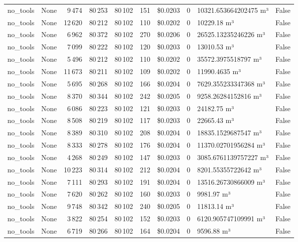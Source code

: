 \documentclass[a4paper,11pt]{article}
\begin{document}
\begin{table}[H]
{\begin{tabular}{l r r r r r r r l r}
no\_tools & None & 9\,474 & 80\,253 & 80\,102 & 151 & \$0.0203 & 0 & 10321.653664202475 m³ & False \\
no\_tools & None & 12\,620 & 80\,212 & 80\,102 & 110 & \$0.0202 & 0 & 10229.18 m³ & False \\
no\_tools & None & 6\,962 & 80\,372 & 80\,102 & 270 & \$0.0206 & 0 & 26525.13235246226 m³ & False \\
no\_tools & None & 7\,099 & 80\,222 & 80\,102 & 120 & \$0.0203 & 0 & 13010.53 m³ & False \\
no\_tools & None & 5\,496 & 80\,212 & 80\,102 & 110 & \$0.0202 & 0 & 35572.3975518797 m³ & False \\
no\_tools & None & 11\,673 & 80\,211 & 80\,102 & 109 & \$0.0202 & 0 & 11990.4635 m³ & False \\
no\_tools & None & 5\,695 & 80\,268 & 80\,102 & 166 & \$0.0204 & 0 & 7629.355233347368 m³ & False \\
no\_tools & None & 8\,370 & 80\,344 & 80\,102 & 242 & \$0.0205 & 0 & 9258.26284152816 m³ & False \\
no\_tools & None & 6\,086 & 80\,223 & 80\,102 & 121 & \$0.0203 & 0 & 24182.75 m³ & False \\
no\_tools & None & 8\,508 & 80\,219 & 80\,102 & 117 & \$0.0203 & 0 & 22665.43 m³ & False \\
no\_tools & None & 8\,389 & 80\,310 & 80\,102 & 208 & \$0.0204 & 0 & 18835.1529687547 m³ & False \\
no\_tools & None & 8\,333 & 80\,278 & 80\,102 & 176 & \$0.0204 & 0 & 11370.02701956284 m³ & False \\
no\_tools & None & 4\,268 & 80\,249 & 80\,102 & 147 & \$0.0203 & 0 & 3085.6761139757227 m³ & False \\
no\_tools & None & 10\,223 & 80\,314 & 80\,102 & 212 & \$0.0204 & 0 & 8201.55355722642 m³ & False \\
no\_tools & None & 7\,111 & 80\,293 & 80\,102 & 191 & \$0.0204 & 0 & 13516.26730866009 m³ & False \\
no\_tools & None & 7\,620 & 80\,262 & 80\,102 & 160 & \$0.0203 & 0 & 9981.97 m³ & False \\
no\_tools & None & 9\,748 & 80\,342 & 80\,102 & 240 & \$0.0205 & 0 & 11813.14 m³ & False \\
no\_tools & None & 3\,822 & 80\,254 & 80\,102 & 152 & \$0.0203 & 0 & 6120.905747109991 m³ & False \\
no\_tools & None & 6\,719 & 80\,266 & 80\,102 & 164 & \$0.0204 & 0 & 9596.88 m³ & False \\

\end{tabular}}
\end{table}
\end{document}
